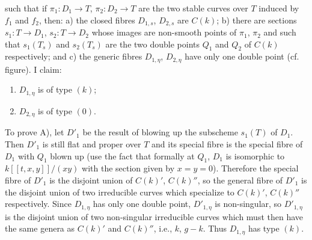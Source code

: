 \documentclass[10pt]{article}
\begin{document}
\begin{center}
\end{center}
such that if $\pi_1:D_1\to T$, $\pi_2:D_2\to T$ are the two stable curves over $T$ induced by $f_1$ and $f_2$, then: a) the closed fibres $D_{1,s}$, $D_{2,s}$ are $C(k)$; b) there are sections $s_1:T\to D_1$, $s_2:T\to D_2$ whose images are non-smooth points of $\pi_1$, $\pi_2$ and such that $s_1(T_s)$ and $s_2(T_s)$ are the two double points $Q_1$ and $Q_2$ of $C(k)$ respectively; and c) the generic fibres $D_{1,\eta}$, $D_{2,\eta}$ have only one double point (cf. figure). I claim:
\begin{enumerate}[label=\Alph*)]
\item $D_{1,\eta}$ is of type $(k)$;
\item $D_{2,\eta}$ is of type $(0)$.
\end{enumerate}

To prove A), let $D'_1$ be the result of blowing up the subscheme $s_1(T)$ of $D_1$. Then $D'_1$ is still flat and proper over $T$ and its special fibre is the special fibre of $D_1$ with $Q_1$ blown up (use the fact that formally at $Q_1$, $D_1$ is isomorphic to $k[[t,x,y]]/(xy)$ with the section given by $x=y=0$). Therefore the special fibre of $D'_1$ is the disjoint union of $C(k)'$, $C(k)''$, so the general fibre of $D'_1$ is the disjoint union of two irreducible curves which specialize to $C(k)'$, $C(k)''$ respectively. Since $D_{1,\eta}$ has only one double point, $D'_{1,\eta}$ is non-singular, so $D'_{1,\eta}$ is the disjoint union of two non-singular irreducible curves which must then have the same genera as $C(k)'$ and $C(k)''$, i.e., $k$, $g-k$. Thus $D_{1,\eta}$ has type $(k)$.
\end{document}
